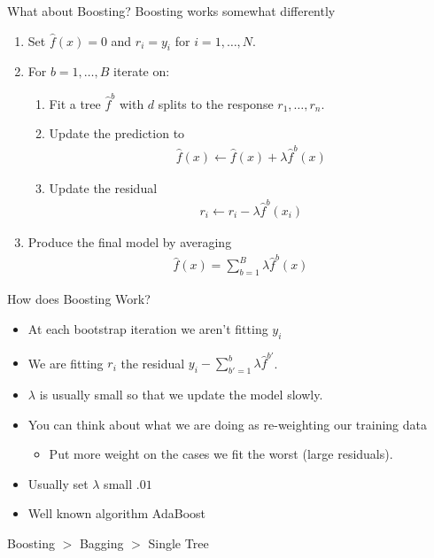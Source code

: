 \documentclass[xcolor=pdftex,dvipsnames,table,mathserif]{beamer}
\begin{document}
\begin{frame}{What about Boosting?}
\alert{Boosting} works somewhat differently
\begin{enumerate}
\item Set $\hat{f}(x) = 0$ and $r_i = y_i$ for $i=1,\ldots, N$.
\item For $b=1,\ldots,B$ iterate on:
\begin{enumerate}
\item Fit a tree $\hat{f}^b$ with $d$ splits to the response $r_1,\ldots, r_n$.
\item Update the prediction to
\begin{align*}
\hat{f}(x) \leftarrow \hat{f}(x)+\lambda \hat{f}^{b}(x)
\end{align*}
\item Update the residual
\begin{align*}
r_{i} \leftarrow r_{i}-\lambda \hat{f}^{b}\left(x_{i}\right)
\end{align*}
\end{enumerate}
\item Produce the final model by averaging
\begin{align*}
\hat{f}(x)=\sum_{b=1}^{B} \lambda \hat{f}^{b}(x)
\end{align*}
\end{enumerate}
\end{frame}


\begin{frame}{How does Boosting Work?}
\begin{itemize}
\item At each bootstrap iteration we aren't fitting $y_i$
\item We are fitting $r_i$ the residual $y_i - \sum_{b'=1}^{b} \lambda \hat{f}^{b'}$. 
\item $\lambda$ is usually small so that we update the model \alert{slowly}.
\item You can think about what we are doing as \alert{re-weighting our training data}
\begin{itemize}
\item Put more weight on the cases we fit the worst (large residuals).
\end{itemize}
\item Usually set $\lambda$ small $.01$
\item Well known algorithm \alert{AdaBoost}
\end{itemize}
Boosting $>$ Bagging $>$ Single Tree
\end{frame}
\end{document}
